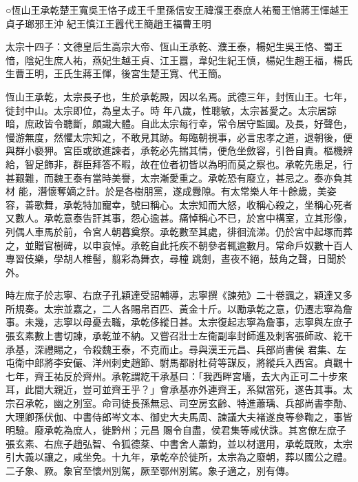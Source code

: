 
\begin{pinyinscope}

 ○恆山王承乾楚王寬吳王恪子成王千里孫信安王禕濮王泰庶人祐蜀王愔蔣王惲越王貞子瑯邪王沖
 紀王慎江王囂代王簡趙王福曹王明



 太宗十四子：文德皇后生高宗大帝、恆山王承乾、濮王泰，楊妃生吳王恪、蜀王愔，陰妃生庶人祐，燕妃生越王貞、江王囂，韋妃生紀王慎，楊妃生趙王福，楊氏生曹王明，王氏生蔣王惲，後宮生楚王寬、代王簡。



 恆山王承乾，太宗長子也，生於承乾殿，因以名焉。武德三年，封恆山王。七年，徙封中山。太宗即位，為皇太子。時
 年八歲，性聰敏，太宗甚愛之。太宗居諒暗，庶政皆令聽斷，頗識大體。自此太宗每行幸，常令居守監國。及長，好聲色，慢游無度，然懼太宗知之，不敢見其跡。每臨朝視事，必言忠孝之道，退朝後，便與群小褻狎。宮臣或欲進諫者，承乾必先揣其情，便危坐斂容，引咎自責。樞機辨給，智足飾非，群臣拜答不暇，故在位者初皆以為明而莫之察也。承乾先患足，行甚艱難，而魏王泰有當時美譽，太宗漸愛重之。承乾恐有廢立，甚忌之。泰亦負其材
 能，潛懷奪嫡之計。於是各樹朋黨，遂成釁隙。有太常樂人年十餘歲，美姿容，善歌舞，承乾特加寵幸，號曰稱心。太宗知而大怒，收稱心殺之，坐稱心死者又數人。承乾意泰告訐其事，怨心逾甚。痛悼稱心不已，於宮中構室，立其形像，列偶人車馬於前，令宮人朝暮奠祭。承乾數至其處，徘徊流涕。仍於宮中起塚而葬之，並贈官樹碑，以申哀悼。承乾自此托疾不朝參者輒逾數月。常命戶奴數十百人專習伎樂，學胡人椎髻，翦彩為舞衣，尋橦
 跳劍，晝夜不絕，鼓角之聲，日聞於外。



 時左庶子於志寧、右庶子孔穎達受詔輔導，志寧撰《諫苑》二十卷諷之，穎達又多所規奏。太宗並嘉之，二人各賜帛百匹、黃金十斤。以勵承乾之意，仍遷志寧為詹事。未幾，志寧以母憂去職，承乾侈縱日甚。太宗復起志寧為詹事，志寧與左庶子張玄素數上書切諫，承乾並不納。又嘗召壯士左衛副率封師進及刺客張師政、紇干承基，深禮賜之，令殺魏王泰，不克而止。尋與漢王元昌、兵部尚書侯
 君集、左屯衛中郎將李安儼、洋州刺史趙節、駙馬都尉杜荷等謀反，將縱兵入西宮。貞觀十七年，齊王祐反於齊州。承乾謂紇干承基曰：「我西畔宮墻，去大內正可二十步來耳，此間大親近，豈可並齊王乎？」會承基亦外連齊王，系獄當死，遂告其事。太宗召承乾，幽之別室。命司徒長孫無忌、司空房玄齡、特進蕭瑀、兵部尚書李勣、大理卿孫伏伽、中書侍郎岑文本、御史大夫馬周、諫議大夫褚遂良等參鞫之，事皆明驗。廢承乾為庶人，徙黔州；元昌
 賜令自盡，侯君集等咸伏誅。其宮僚左庶子張玄素、右庶子趙弘智、令狐德棻、中書舍人蕭鈞，並以材選用，承乾既敗，太宗引大義以讓之，咸坐免。十九年，承乾卒於徙所，太宗為之廢朝，葬以國公之禮。二子象、厥。象官至懷州別駕，厥至鄂州別駕。象子適之，別有傳。




\end{pinyinscope}
